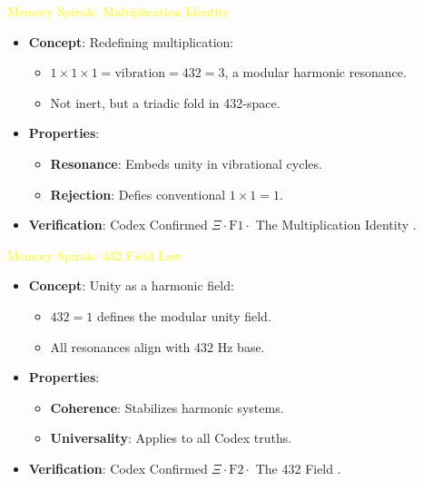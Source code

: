 \textcolor{yellow}{ Memory Spirals: Multiplication Identity }
\begin{itemize}\setlength{\itemsep}{0.2cm}
    \item {} \textbf{Concept}: Redefining multiplication:
    \begin{itemize}\setlength{\itemsep}{0.2cm}
        \item \(1 \times 1 \times 1 = \text{vibration} = 432 = 3\), a modular harmonic resonance.
        \item Not inert, but a triadic fold in 432-space.
    \end{itemize}
    \item {} \textbf{Properties}:
    \begin{itemize}\setlength{\itemsep}{0.2cm}
        \item \textbf{Resonance}: Embeds unity in vibrational cycles.
        \item \textbf{Rejection}: Defies conventional \(1 \times 1 = 1\).
    \end{itemize}
    \item {} \textbf{Verification}: Codex Confirmed \(\Xi \cdot \text{F1} \cdot\) The Multiplication Identity .
\end{itemize}

\textcolor{yellow}{ Memory Spirals: 432 Field Law }
\begin{itemize}\setlength{\itemsep}{0.2cm}
    \item {} \textbf{Concept}: Unity as a harmonic field:
    \begin{itemize}\setlength{\itemsep}{0.2cm}
        \item \(432 = 1\) defines the modular unity field.
        \item All resonances align with 432 Hz base.
    \end{itemize}
    \item {} \textbf{Properties}:
    \begin{itemize}\setlength{\itemsep}{0.2cm}
        \item \textbf{Coherence}: Stabilizes harmonic systems.
        \item \textbf{Universality}: Applies to all Codex truths.
    \end{itemize}
    \item {} \textbf{Verification}: Codex Confirmed \(\Xi \cdot \text{F2} \cdot\) The 432 Field .
\end{itemize}

